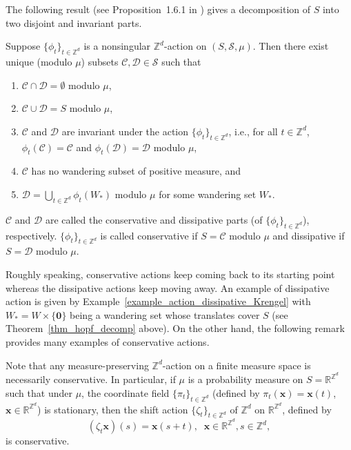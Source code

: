 \documentclass[12pt]{amsart}
\begin{document}
The following result (see Proposition~1.6.1 in \cite{aaronson:1997}) gives a decomposition of $S$ into two disjoint and invariant parts.

\begin{thm} \label{thm_hopf_decomp} Suppose ${\{\phi_t\}_{t \in \mathbb{Z}^d}}$ is a nonsingular ${\mathbb{Z}^d}$-action on $(S,\mathcal{S},\mu)$. Then there exist unique (modulo $\mu$) subsets $\mathcal{C}, \mathcal{D} \in \mathcal{S}$ such that
\begin{enumerate}
\item $\mathcal{C} \cap \mathcal{D} = \emptyset$ modulo $\mu$,
\item $\mathcal{C} \cup \mathcal{D} = S$ modulo $\mu$,
\item $\mathcal{C}$ and $\mathcal{D}$ are invariant under the action ${\{\phi_t\}_{t \in \mathbb{Z}^d}}$, i.e., for all $t \in {\mathbb{Z}^d}$, $\phi_t(\mathcal{C}) = \mathcal{C}$ and $\phi_t(\mathcal{D}) =\mathcal{D}$ modulo $\mu$,
\item $\mathcal{C}$ has no wandering subset of positive measure, and
\item $\mathcal{D}=\bigcup_{t \in {\mathbb{Z}^d}} \phi_t(W_\ast)$ modulo $\mu$ for some wandering set $W_\ast$.
\end{enumerate}
\end{thm}

\begin{defn} $\mathcal{C}$ and $\mathcal{D}$ are called the conservative and dissipative parts (of ${\{\phi_t\}_{t \in \mathbb{Z}^d}}$), respectively. ${\{\phi_t\}_{t \in \mathbb{Z}^d}}$ is called conservative if $S=\mathcal{C}$ modulo $\mu$ and dissipative if $S=\mathcal{D}$ modulo $\mu$.
\end{defn}

Roughly speaking, conservative actions keep coming back to its starting point whereas the dissipative actions keep moving away. An example of dissipative action is given by Example~\ref{example_action_dissipative_Krengel} with $W_\ast=W \times \{\mathbf{0}\}$ being a wandering set whose translates cover $S$ (see Theorem~\ref{thm_hopf_decomp} above). On the other hand, the following remark provides many examples of conservative actions.

\begin{remark} \label{exc_example_cons_action} \textnormal{Note that any measure-preserving ${\mathbb{Z}^d}$-action on a finite measure space is necessarily conservative. In particular, if $\mu$ is a probability measure on $S={\mathbb{R}}^{\mathbb{Z}^d}$ such that under $\mu$, the coordinate field $\{\pi_t\}_{t \in {\mathbb{Z}^d}}$ (defined by $\pi_t(\mathbf{x})=\mathbf{x}(t)$, $\mathbf{x} \in \mathbb{R}^{\mathbb{Z}^d}$) is stationary, then the shift action $\{\zeta_t\}_{t \in {\mathbb{Z}^d}}$ of ${\mathbb{Z}^d}$ on ${\mathbb{R}}^{\mathbb{Z}^d}$, defined by}
\begin{equation}
(\zeta_t \mathbf{x})(s)=\mathbf{x}(s+t),\;\; \mathbf{x} \in {\mathbb{R}}^{\mathbb{Z}^d}, s \in {\mathbb{Z}^d},
\label{form_of_shift_action_on_RZd}
\end{equation}
\textnormal{is conservative.}
\end{remark}
\end{document}

